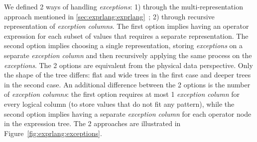 We defined 2 ways of handling \textit{exceptions}: 1) through the multi-representation approach mentioned in \ref{sec:exprlang:exprlang}~; 2) through recursive representation of \textit{exception columns}. The first option implies having an operator expression for each subset of values that requires a separate representation. The second option implies choosing a single representation, storing \textit{exceptions} on a separate \textit{exception column} and then recursively applying the same process on the \textit{exceptions}. The 2 options are equivalent from the physical data perspective. Only the shape of the tree differs: flat and wide trees in the first case and deeper trees in the second case. An additional difference between the 2 options is the number of \textit{exception columns}: the first option requires at most 1 \textit{exception column} for every logical column (to store values that do not fit any pattern), while the second option implies having a separate \textit{exception column} for each operator node in the expression tree. The 2 approaches are illustrated in Figure~\ref{fig:exprlang:exceptions}.

